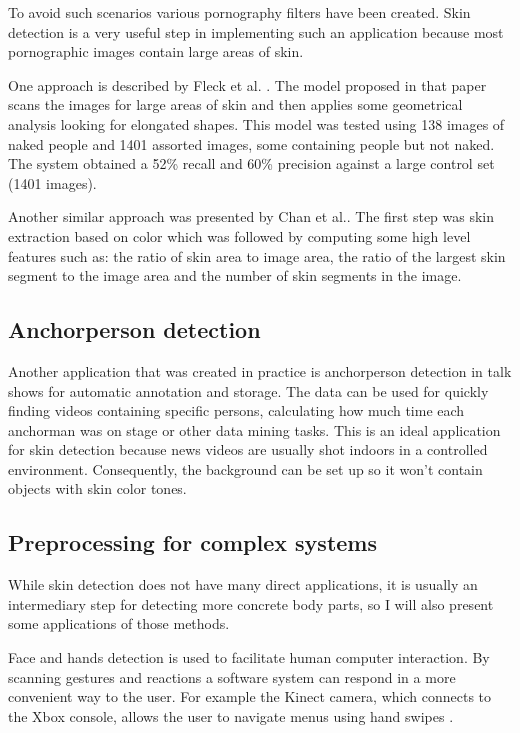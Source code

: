 \documentclass[12pt]{report}
\begin{document}
	To avoid such scenarios various pornography filters have been created. Skin detection is a very useful step in implementing such an application because most pornographic images contain large areas of skin.
	
	One approach is described by Fleck et al. \cite{finding_naked_people}. The model proposed in that paper scans the images for large areas of skin and then applies some geometrical analysis looking for elongated shapes. This model was tested using 138 images of naked people and 1401 assorted images, some containing people but not naked. The system obtained a 52\% recall and 60\% precision against a large control set (1401 images).
	
	Another similar approach was presented by Chan et al.\cite{pornography_filter_with_ratios}. The first step was skin extraction based on color which was followed by computing some high level features such as: the ratio of skin area to image area, the ratio of the largest skin segment to the image area and the number of skin segments in the image.
	
	\subsection{Anchorperson detection}
	Another application that was created in practice is anchorperson detection in talk shows \cite{anchor_person_detection} for automatic annotation and storage. The data can be used for quickly finding videos containing specific persons, calculating how much time each anchorman was on stage or other data mining tasks. This is an ideal application for skin detection because news videos are usually shot indoors in a controlled environment. Consequently, the background can be set up so it won't contain objects with skin color tones.
	
	\subsection{Preprocessing for complex systems}
	While skin detection does not have many direct applications, it is usually an intermediary step for detecting more concrete body parts, so I will also present some applications of those methods.
	
	Face and hands detection is used to facilitate human computer interaction. By scanning gestures and reactions a software system can respond in a more convenient way to the user. For example the Kinect camera, which connects to the Xbox console, allows the user to navigate menus using hand swipes \cite{kinect_control}. 
	
\end{document}
